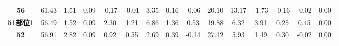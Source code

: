 \documentclass[withoutpreface,bwprint]{cumcmthesis} %
\begin{document}
\begin{appendices}
\begin{table}[!h]
\begin{tabular}{@{}ccccccccccccccc@{}}
			\textbf{56}      & 61.43                                                          & 1.51                                                          & 0.09                                                         & -0.17                                                        & -0.01                                                        & 3.35                                                           & 0.16                                                           & -0.06                                                        & 20.10                                                        & 13.17                                                        & -1.73                                                           & -0.16                                                        & -0.02                                                         & 0.00                                                          \\
			\textbf{51部位1}   & 56.49                                                          & 1.52                                                          & 0.09                                                         & 2.30                                                         & 1.21                                                         & 6.86                                                           & 1.36                                                           & 0.53                                                         & 19.88                                                        & 6.32                                                         & 3.91                                                            & 0.25                                                         & 0.45                                                          & 0.00                                                          \\
			\textbf{52}      & 56.91                                                          & 2.82                                                          & 0.09                                                         & 0.92                                                         & 0.55                                                         & 2.69                                                           & 0.39                                                           & -0.14                                                        & 27.12                                                        & 5.93                                                         & 1.49                                                            & 0.30                                                         & -0.02                                                         & 0.00                                                          \\

\end{tabular}
\end{table}
\end{appendices}
\end{document}
